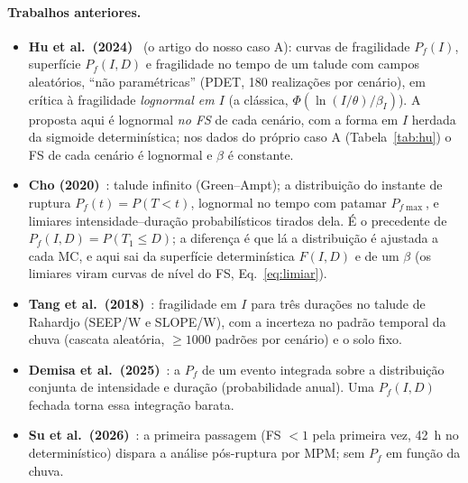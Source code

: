 \documentclass[11pt,a4paper]{article}
\newcommand{\Pf}{P_f}
\begin{document}
\paragraph{Trabalhos anteriores.}
\begin{itemize}
  \item \textbf{Hu et al.\ (2024)}~\cite{hu2024} (o artigo do nosso caso A): curvas de fragilidade
    $\Pf(I)$, superfície $\Pf(I, D)$ e fragilidade no tempo de um talude com campos aleatórios, ``não paramétricas''
    (PDET, 180 realizações por cenário), em crítica à fragilidade \emph{lognormal em $I$} (a clássica, $\Phi(\ln(I/\theta)/
    \beta_I)$). A proposta aqui é lognormal \emph{no FS} de cada cenário, com a forma em $I$ herdada da sigmoide
    determinística; nos dados do próprio caso A (Tabela~\ref{tab:hu}) o FS de cada cenário é lognormal e $\beta$ é
    constante.
  \item \textbf{Cho (2020)}~\cite{cho2020}: talude infinito (Green--Ampt); a distribuição do instante de
    ruptura $\Pf(t) = P(T < t)$, lognormal no tempo com patamar $P_{f\max}$, e limiares intensidade--duração
    probabilísticos tirados dela. É o precedente de $\Pf(I, D) = P(T_1 \le D)$; a diferença é que lá a distribuição é
    ajustada a cada MC, e aqui sai da superfície determinística $F(I, D)$ e de um $\beta$ (os limiares viram curvas de
    nível do FS, Eq.~\ref{eq:limiar}).
  \item \textbf{Tang et al.\ (2018)}~\cite{tang2018}: fragilidade em $I$ para três durações no talude de Rahardjo
    (SEEP/W e SLOPE/W), com a incerteza no padrão temporal da chuva (cascata aleatória, $\ge 1000$ padrões por cenário) e
    o solo fixo.
  \item \textbf{Demisa et al.\ (2025)}~\cite{demisa2025}: a $\Pf$ de um evento integrada sobre a
    distribuição conjunta de intensidade e duração (probabilidade anual). Uma $\Pf(I, D)$ fechada torna essa integração
    barata.
  \item \textbf{Su et al.\ (2026)}~\cite{su2026}: a primeira passagem (FS $< 1$ pela primeira vez, 42~h no determinístico) dispara a
    análise pós-ruptura por MPM; sem $\Pf$ em função da chuva.
\end{itemize}
\end{document}
